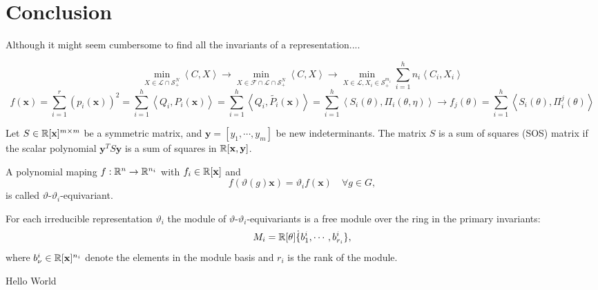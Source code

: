 \documentclass[]{article}
\begin{document}
\section{Conclusion}
Although it might seem cumbersome to find all the invariants of a representation.... 



\[ \min_{X\in\mathcal{L}\cap \mathcal{S}_+^N } \left<C,X\right> \rightarrow 
\min_{X\in\mathcal{F}\cap\mathcal{L}\cap \mathcal{S}_+^N } \left<C,X\right> \rightarrow
\min_{X\in\mathcal{L}, X_i \in \mathcal{S}_+^{m_i} }\sum_{i=1}^{h} n_i\left<C_i,X_i\right>\]
\[f(\mathbf{x}) = \sum_{i= 1}^{r} (p_i(\mathbf{x}))^2 
                = \sum_{i=1}^{h}\left<Q_i,P_i(\mathbf{x})\right> 
                = \sum_{i=1}^{h}\left<Q_i,\tilde{P_i}(\mathbf{x})\right>
                = \sum_{i=1}^{h}\left<S_i(\theta),\Pi_i(\theta,\eta)\right> 
                \rightarrow f_j(\theta) = \sum_{i=1}^{h}\left<S_i(\theta),\Pi_i^j(\theta)\right>  \]

\begin{definition}
    Let $S\in \mathbb R[\textbf{x}]^{m\times m}$ be a symmetric matrix, and $\textbf{y} = [y_1,\cdots,y_m]$ be new indeterminants. The matrix $S$ is a sum of squares (SOS) matrix if the scalar polynomial $\textbf{y}^TS\textbf{y}$ 
    is a sum of squares in $\mathbb R[\textbf{x},\textbf{y}]$.   
\end{definition}

\begin{definition}
    A polynomial maping $f:\mathbb R^n\rightarrow \mathbb R^{n_i}$ with $f_i\in\mathbb R[\mathbf{x}]$ and 
    \[ f(\vartheta(g)\mathbf{x}) =\vartheta_i f(\mathbf{x})\quad \forall g\in G, \]
is called $\vartheta$-$\vartheta_i$-equivariant.
\end{definition}


\begin{theorem}
    For each irreducible representation $\vartheta_i$ the module of $\vartheta$-$\vartheta_i$-equivariants is a
    free module over the ring in the primary invariants:
    \[M_i = \mathbb R[\theta]\dot\{b_1^i,\cdots,b_{r_i}^i\},\]
    where $b_{\nu}^i\in \mathbb R[\mathbf{x}]^{n_i}$ denote the elements in the module basis and $r_i$ is the rank of the module.
\end{theorem}


\cite{Gatermann_2004}



Hello World

\end{document}
